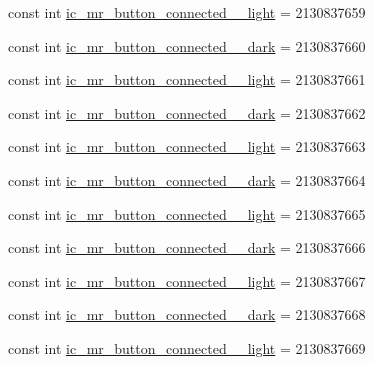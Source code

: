 \begin{DoxyCompactItemize}
const int \mbox{\hyperlink{class_f_w_p_s___app_1_1_droid_1_1_resource_1_1_drawable_a5f4dd49d46366ebb46c10df0480802bb}{ic\+\_\+mr\+\_\+button\+\_\+connected\+\_\+\_\+light}} = 2130837659
\item 
const int \mbox{\hyperlink{class_f_w_p_s___app_1_1_droid_1_1_resource_1_1_drawable_a6600dde915fc2e0a6e7b9d9f145be586}{ic\+\_\+mr\+\_\+button\+\_\+connected\+\_\+\_\+dark}} = 2130837660
\item 
const int \mbox{\hyperlink{class_f_w_p_s___app_1_1_droid_1_1_resource_1_1_drawable_a38a68bc38c598b4127d2a02f94301adc}{ic\+\_\+mr\+\_\+button\+\_\+connected\+\_\+\_\+light}} = 2130837661
\item 
const int \mbox{\hyperlink{class_f_w_p_s___app_1_1_droid_1_1_resource_1_1_drawable_aba7772881c0228e229da8d3d0dae33f3}{ic\+\_\+mr\+\_\+button\+\_\+connected\+\_\+\_\+dark}} = 2130837662
\item 
const int \mbox{\hyperlink{class_f_w_p_s___app_1_1_droid_1_1_resource_1_1_drawable_ade83d05f517e3c2280cbc644599b2450}{ic\+\_\+mr\+\_\+button\+\_\+connected\+\_\+\_\+light}} = 2130837663
\item 
const int \mbox{\hyperlink{class_f_w_p_s___app_1_1_droid_1_1_resource_1_1_drawable_a419df830674c8a5d57c27dc784380b2c}{ic\+\_\+mr\+\_\+button\+\_\+connected\+\_\+\_\+dark}} = 2130837664
\item 
const int \mbox{\hyperlink{class_f_w_p_s___app_1_1_droid_1_1_resource_1_1_drawable_afc301ab2e03098671a01165c85ded4c7}{ic\+\_\+mr\+\_\+button\+\_\+connected\+\_\+\_\+light}} = 2130837665
\item 
const int \mbox{\hyperlink{class_f_w_p_s___app_1_1_droid_1_1_resource_1_1_drawable_afab16552d7a2123968f68e210c8c83a4}{ic\+\_\+mr\+\_\+button\+\_\+connected\+\_\+\_\+dark}} = 2130837666
\item 
const int \mbox{\hyperlink{class_f_w_p_s___app_1_1_droid_1_1_resource_1_1_drawable_aa35968e3fdb7d0ce2d9e6cd93f0f79bf}{ic\+\_\+mr\+\_\+button\+\_\+connected\+\_\+\_\+light}} = 2130837667
\item 
const int \mbox{\hyperlink{class_f_w_p_s___app_1_1_droid_1_1_resource_1_1_drawable_a26c7c8ab26e5ee7618d67c9a58bee7a0}{ic\+\_\+mr\+\_\+button\+\_\+connected\+\_\+\_\+dark}} = 2130837668
\item 
const int \mbox{\hyperlink{class_f_w_p_s___app_1_1_droid_1_1_resource_1_1_drawable_af985210143eb434e1b561e3ee8ec8857}{ic\+\_\+mr\+\_\+button\+\_\+connected\+\_\+\_\+light}} = 2130837669
\item 

\end{DoxyCompactItemize}
